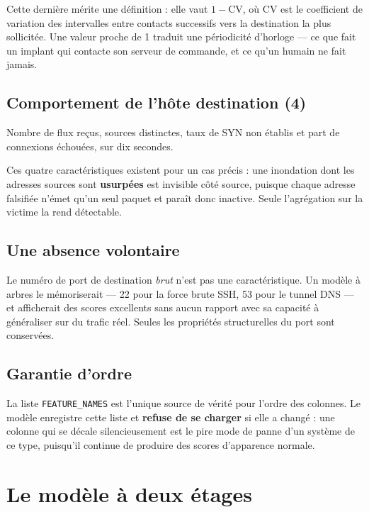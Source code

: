 \documentclass[11pt,a4paper]{article}
\begin{document}
Cette dernière mérite une définition : elle vaut $1 - \mathrm{CV}$, où $\mathrm{CV}$ est le
coefficient de variation des intervalles entre contacts successifs vers la destination la plus
sollicitée. Une valeur proche de 1 traduit une périodicité d'horloge --- ce que fait un implant qui
contacte son serveur de commande, et ce qu'un humain ne fait jamais.

\subsection{Comportement de l'hôte destination (4)}

Nombre de flux reçus, sources distinctes, taux de SYN non établis et part de connexions échouées,
sur dix secondes.

Ces quatre caractéristiques existent pour un cas précis : une inondation dont les adresses sources
sont \textbf{usurpées} est invisible côté source, puisque chaque adresse falsifiée n'émet qu'un seul
paquet et paraît donc inactive. Seule l'agrégation sur la victime la rend détectable.

\subsection{Une absence volontaire}

Le numéro de port de destination \emph{brut} n'est pas une caractéristique. Un modèle à arbres le
mémoriserait --- 22 pour la force brute SSH, 53 pour le tunnel DNS --- et afficherait des scores
excellents sans aucun rapport avec sa capacité à généraliser sur du trafic réel. Seules les
propriétés structurelles du port sont conservées.

\subsection{Garantie d'ordre}

La liste \texttt{FEATURE\_NAMES} est l'unique source de vérité pour l'ordre des colonnes. Le modèle
enregistre cette liste et \textbf{refuse de se charger} si elle a changé : une colonne qui se
décale silencieusement est le pire mode de panne d'un système de ce type, puisqu'il continue de
produire des scores d'apparence normale.

\section{Le modèle à deux étages}
\end{document}
